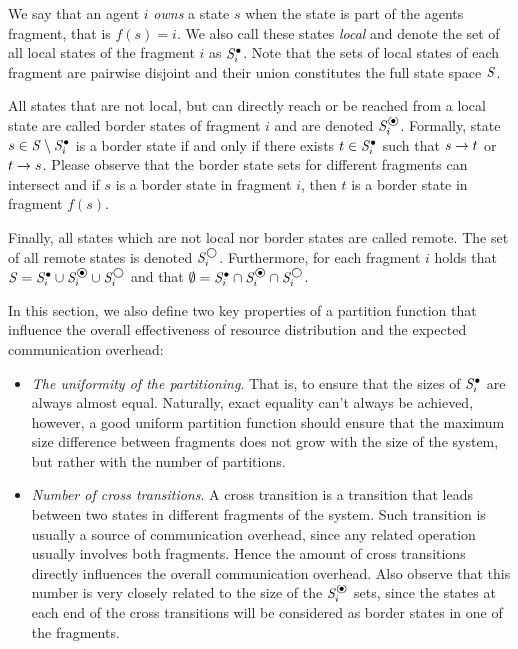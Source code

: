 We say that an agent $i$ \emph{owns} a state $s$ when the state is part of the agents fragment, that is $f(s) = i$. We also call these states \emph{local} and denote the set of all local states of the fragment $i$ as $\mathit{S}^\bullet_i$. Note that the sets of local states of each fragment are pairwise disjoint and their union constitutes the full state space $\mathit{S}$. 

All states that are not local, but can directly reach or be reached from a local state are called border states of fragment $i$ and are denoted $\dtsSborder_i$. Formally, state $s \in \mathit{S} \setminus \mathit{S}^\bullet_i$ is a border state if and only if there exists $t \in \mathit{S}^\bullet_i$ such that $s \rightarrow t$ or $t \rightarrow s$. Please observe that the border state sets for different fragments can intersect and if $s$ is a border state in fragment $i$, then $t$ is a border state in fragment $f(s)$.

Finally, all states which are not local nor border states are called remote. The set of all remote states is denoted $\mathit{S}^\bigcirc_i$. Furthermore, for each fragment $i$ holds that $\dtsS = \dtsSlocal_i \cup \dtsSborder_i \cup \dtsSremote_i$ and that $\emptyset = \dtsSlocal_i \cap \dtsSborder_i \cap \dtsSremote_i$.

In this section, we also define two key properties of a partition function that influence the overall effectiveness of resource distribution and the expected communication overhead:

\begin{itemize}
	\item  \emph{The uniformity of the partitioning}. That is, to ensure that the sizes of $\mathit{S}^\bullet_i$ are always almost equal. Naturally, exact equality can't always be achieved, however, a good uniform partition function should ensure that the maximum size difference between fragments does not grow with the size of the system, but rather with the number of partitions.
	\item \emph{Number of cross transitions}. A cross transition is a transition that leads between two states in different fragments of the system. Such transition is usually a source of communication overhead, since any related operation usually involves both fragments. Hence the amount of cross transitions directly influences the overall communication overhead. Also observe that this number is very closely related to the size of the $\dtsSborder_i$ sets, since the states at each end of the cross transitions will be considered as border states in one of the fragments.
\end{itemize}

